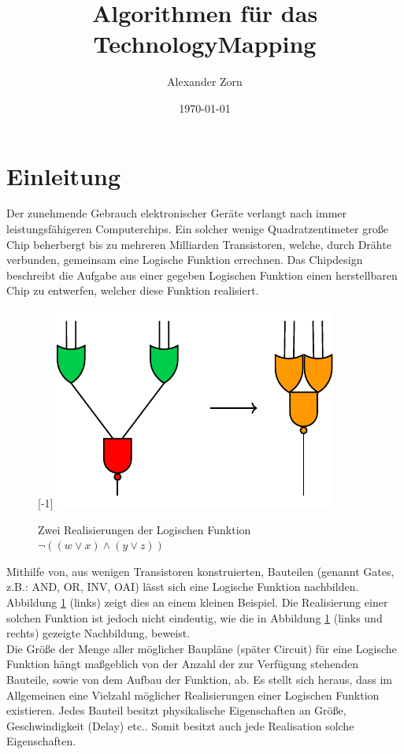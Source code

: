\documentclass[11pt, a4paper, german]{article}
\author{Alexander Zorn}
\date{\today}
\title{Algorithmen f\"ur das TechnologyMapping}
\begin{document}
\maketitle

\tableofcontents
\newpage 
\section{Einleitung}
\label{sec:einleitung}
Der zunehmende Gebrauch elektronischer Geräte verlangt nach immer leistungsfähigeren Computerchips. Ein solcher wenige Quadratzentimeter große Chip beherbergt bis zu mehreren Milliarden Transistoren, welche, durch Drähte verbunden, gemeinsam eine Logische Funktion errechnen. Das Chipdesign beschreibt die Aufgabe aus einer gegeben Logischen Funktion einen herstellbaren Chip zu entwerfen, welcher diese Funktion realisiert. \\ 
\begin{figure}
	\scalebox{1}[-1]{
		\includegraphics[]{pictures/compiled/einfBsp}
	}
		\caption{Zwei Realisierungen der Logischen Funktion $\neg((w\lor x) \land (y \lor z))$}
		\label{bild:einfbsp}
\end{figure}
Mithilfe von, aus wenigen Transistoren konstruierten, Bauteilen (genannt Gates, z.B.: AND, OR, INV, OAI) lässt sich eine Logische Funktion nachbilden. Abbildung \ref{bild:einfbsp} (links) zeigt dies an einem kleinen Beispiel.  Die Realisierung einer solchen Funktion ist jedoch nicht eindeutig, wie die in Abbildung \ref{bild:einfbsp} (links und rechts) gezeigte Nachbildung, beweist. \\
Die Größe der Menge aller möglicher Baupläne (später Circuit) für eine Logische Funktion hängt maßgeblich von der Anzahl der zur Verfügung stehenden Bauteile, sowie von dem Aufbau der Funktion, ab.
Es stellt sich heraus, dass im Allgemeinen eine Vielzahl möglicher Realisierungen einer Logischen Funktion existieren. Jedes Bauteil besitzt physikalische Eigenschaften an Größe, Geschwindigkeit (Delay) etc.. Somit besitzt auch jede Realisation solche Eigenschaften. \\
\end{document}
